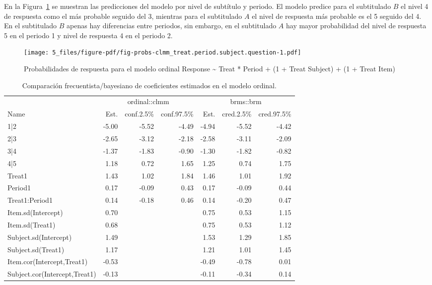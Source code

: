 \documentclass[
  12pt,
  a4paper,
  extrafontsizes,
  onecolumn,
  openright,
  table]{memoir}
\begin{document}
En la Figura~\ref{fig-probs-clmm_treat.period.subject.question} se
muestran las predicciones del modelo por nivel de subtítulo y periodo.
El modelo predice para el subtitulado \(B\) el nivel 4 de respuesta como
el más probable seguido del 3, mientras para el subtitulado \(A\) el
nivel de respuesta más probable es el 5 seguido del 4. En el subtitulado
\(B\) apenas hay diferencias entre periodos, sin embargo, en el
subtitulado \(A\) hay mayor probabilidad del nivel de respuesta 5 en el
periodo 1 y nivel de respuesta 4 en el periodo 2.

\begin{figure}[h]

{\centering \texttt{[image: 5\_files/figure-pdf/fig-probs-clmm\_treat.period.subject.question-1.pdf]}

}

\caption[Probabilidades de respuesta para el modelo ordinal
seleccionado.]{\label{fig-probs-clmm_treat.period.subject.question}Probabilidades
de respuesta para el modelo ordinal Response \textasciitilde{} Treat *
Period + (1 + Treat \textbar{} Subject) + (1 + Treat \textbar{} Item)}

\end{figure}

\scriptsize

\hypertarget{tbl-model-comp}{}
\begin{longtable}{lrrrrrr}
\caption{\label{tbl-model-comp}Comparación frecuentista/bayesiano de coeficientes estimados en el
modelo ordinal. }\tabularnewline

\toprule
 & \multicolumn{3}{c}{ordinal::clmm} & \multicolumn{3}{c}{brms::brm} \\ 
\cmidrule(lr){2-4} \cmidrule(lr){5-7}
Name & Est. & conf.2.5\% & conf.97.5\% & Est. & cred.2.5\% & cred.97.5\% \\ 
\midrule
1|2 & -5.00 & -5.52 & -4.49 & -4.94 & -5.52 & -4.42 \\ 
2|3 & -2.65 & -3.12 & -2.18 & -2.58 & -3.11 & -2.09 \\ 
3|4 & -1.37 & -1.83 & -0.90 & -1.30 & -1.82 & -0.82 \\ 
4|5 & 1.18 & 0.72 & 1.65 & 1.25 & 0.74 & 1.75 \\ 
Treat1 & 1.43 & 1.02 & 1.84 & 1.46 & 1.01 & 1.92 \\ 
Period1 & 0.17 & -0.09 & 0.43 & 0.17 & -0.09 & 0.44 \\ 
Treat1:Period1 & 0.14 & -0.18 & 0.46 & 0.14 & -0.20 & 0.47 \\ 
Item.sd(Intercept) & 0.70 &  &  & 0.75 & 0.53 & 1.15 \\ 
Item.sd(Treat1) & 0.68 &  &  & 0.75 & 0.53 & 1.12 \\ 
Subject.sd(Intercept) & 1.49 &  &  & 1.53 & 1.29 & 1.85 \\ 
Subject.sd(Treat1) & 1.17 &  &  & 1.21 & 1.01 & 1.45 \\ 
Item.cor(Intercept,Treat1) & -0.53 &  &  & -0.49 & -0.78 & 0.01 \\ 
Subject.cor(Intercept,Treat1) & -0.13 &  &  & -0.11 & -0.34 & 0.14 \\ 
\bottomrule
\end{longtable}
\end{document}
